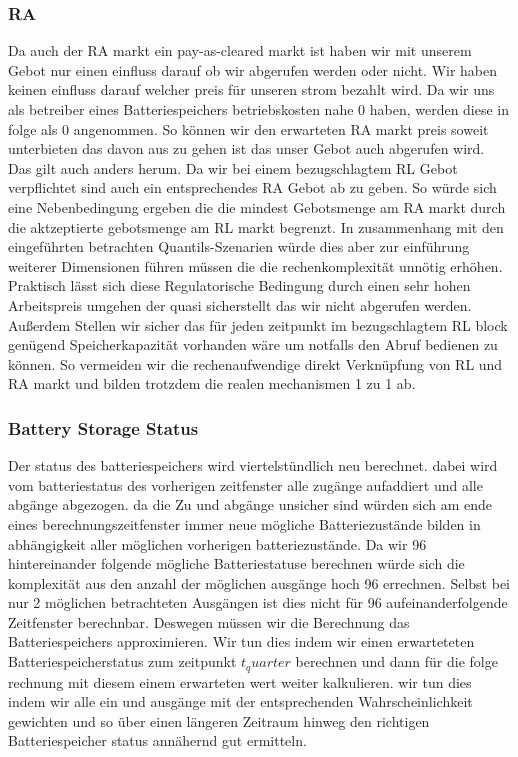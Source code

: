 \subsubsection{RA}
Da auch der RA markt ein pay-as-cleared markt ist haben wir mit unserem Gebot nur einen einfluss darauf ob wir abgerufen werden oder nicht.
Wir haben keinen einfluss darauf welcher preis für unseren strom bezahlt wird.
Da wir uns als betreiber eines Batteriespeichers betriebskosten nahe 0 haben, werden diese in folge als 0 angenommen.
So können wir den erwarteten RA markt preis soweit unterbieten das davon aus zu gehen
ist das unser Gebot auch abgerufen wird. Das gilt auch anders herum. Da wir bei einem bezugschlagtem RL Gebot
verpflichtet sind auch ein entsprechendes RA Gebot ab zu geben. So würde sich eine Nebenbedingung ergeben die die
mindest Gebotsmenge am RA markt durch die aktzeptierte gebotsmenge am RL markt begrenzt. In zusammenhang mit den eingeführten betrachten
Quantils-Szenarien würde dies aber zur einführung weiterer Dimensionen führen müssen die die rechenkomplexität unnötig erhöhen.
Praktisch lässt sich diese Regulatorische Bedingung durch einen sehr hohen Arbeitspreis umgehen der quasi sicherstellt das wir nicht abgerufen werden.
Außerdem Stellen wir sicher das für jeden zeitpunkt im bezugschlagtem RL block genügend Speicherkapazität vorhanden wäre um notfalls
den Abruf bedienen zu können. So vermeiden wir die rechenaufwendige direkt Verknüpfung von RL und RA markt und bilden trotzdem die realen mechanismen 1 zu 1 ab.

\subsubsection{Battery Storage Status}
Der status des batteriespeichers wird viertelstündlich neu berechnet.
dabei wird vom batteriestatus des vorherigen zeitfenster alle zugänge aufaddiert und alle abgänge abgezogen.
da die Zu und abgänge unsicher sind würden sich am ende eines berechnungszeitfenster immer neue mögliche Batteriezustände bilden in
abhängigkeit aller möglichen vorherigen batteriezustände. Da wir 96 hintereinander folgende mögliche Batteriestatuse berechnen würde
sich die komplexität aus den anzahl der möglichen ausgänge hoch 96 errechnen. Selbst bei nur 2 möglichen betrachteten Ausgängen
ist dies nicht für 96 aufeinanderfolgende Zeitfenster berechnbar. Deswegen müssen wir die Berechnung das Batteriespeichers
approximieren. Wir tun dies indem wir einen erwarteteten Batteriespeicherstatus zum zeitpunkt $t_quarter$ berechnen und dann
für die folge rechnung mit diesem einem erwarteten wert weiter kalkulieren. wir tun dies indem wir alle ein und ausgänge mit der
entsprechenden Wahrscheinlichkeit gewichten und so über einen längeren Zeitraum hinweg den richtigen Batteriespeicher status annähernd gut ermitteln.

